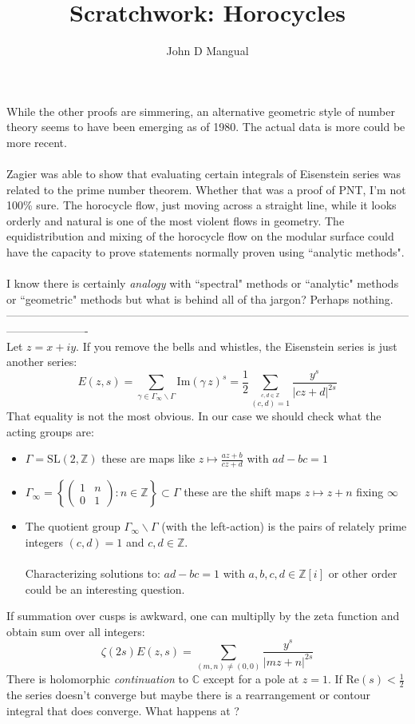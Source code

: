 \documentclass[12pt]{article}
\title{Scratchwork: Horocycles}
\author{John D Mangual}
\date{}
\newcommand{\linebrk}{----------------------------------------------------------------------------------------------------------------------------------}
\begin{document}
\selectfont \fontsize{12.5}{15}\selectfont

\maketitle

\noindent While the other proofs are simmering, an alternative geometric style of number theory seems to have been emerging as of 1980.  The actual data is more could be more recent.  \\ \\
Zagier was able to show that evaluating certain integrals of Eisenstein series was related to the prime number theorem.  Whether that was a proof of PNT, I'm not 100\% sure.  The horocycle flow, just moving across a straight line, while it looks orderly and natural is one of the most violent flows in geometry.  The equidistribution and mixing of the horocycle flow on the modular surface could have the capacity to prove statements normally proven using ``analytic methods". \\ \\
I know there is certainly \textit{analogy} with ``spectral" methods or ``analytic" methods or ``geometric" methods but what is behind all of tha jargon?  Perhaps nothing. \\
\linebrk \\
Let $z = x + iy$.  If you remove the bells and whistles, the Eisenstein series is just another series:
$$ E(z,s) = \sum_{\gamma \in \Gamma_\infty \backslash \Gamma } \mathrm{Im}(\gamma \, z)^s = \frac{1}{2} \sum_{\stackrel{c,d \in \mathbb{Z}}{(c,d)=1}} \frac{y^s}{|cz + d|^{2s}} $$
That equality is not the most obvious.  In our case we should check what the acting groups are:
\begin{itemize}
\item $\Gamma = \mathrm{SL}(2, \mathbb{Z})$ these are maps like $z \mapsto \frac{az+b}{cz+d}$ with $ad-bc=1$
\item $\Gamma_\infty = \left\{  \left(\begin{array}{cc} 1 & n \\ 0 & 1 \end{array}\right) : n \in \mathbb{Z} \right\} \subset \Gamma $ these are the shift maps $z \mapsto z + n$ fixing $\infty$
\item The {\color{green}quotient group} $\Gamma_\infty \backslash \Gamma$ (with the left-action) is the pairs of relately prime integers $(c,d) = 1$ and $c, d \in \mathbb{Z}$. \\ \\ Characterizing solutions to: $ad-bc = 1$ with $a,b,c,d \in \mathbb{Z}[i]$ or other order could be an interesting question.
\end{itemize}
If summation over cusps is awkward, one can multiplly by the zeta function and obtain sum over all integers:
$$ \zeta(2s) E(z,s) = \sum_{(m,n) \neq (0,0)} \frac{y^s}{|mz + n|^{2s}}  $$
There is holomorphic \textit{continuation}  to $\mathbb{C}$ except for a pole at $z=1$. If $\mathrm{Re}(s) < \frac{1}{2}$ the series doesn't converge but maybe there is a rearrangement or contour integral that does converge. What happens at  ?
\end{document}
